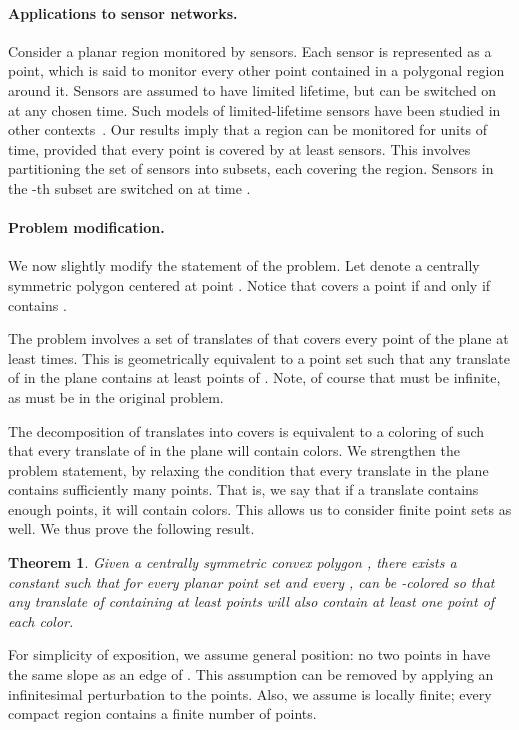 \documentclass[english,11pt]{article}
\newtheorem{theorem}{Theorem}
\begin{document}
\paragraph{Applications to sensor networks.}
Consider a planar region monitored by sensors. Each sensor is represented as a point, which is said to monitor every other point contained in a polygonal region around it. Sensors are assumed to have limited lifetime, but can be switched on at any chosen time. Such models of limited-lifetime sensors have been studied in other contexts~\cite{othersensors}. Our results imply that a region can be monitored for  units of time, provided that every point is covered by at least  sensors. This involves partitioning the set of sensors into  subsets, each covering the region. Sensors in the 
-th subset are switched on at time . 

\paragraph{Problem modification.}
We now slightly modify the statement of the problem.  Let  denote a centrally symmetric polygon  centered at point .  Notice that  covers a point  if and only if  contains .
 
The problem involves a set of translates of  that covers every point of the plane  at least  times. 
This is geometrically equivalent to a point set  such that any translate of  in the plane contains at least  points of .    
Note, of course that  must be infinite, as must be  in the original problem.

The decomposition of translates into  covers is equivalent to a coloring of  such that every translate of  in the plane will contain  colors.
We strengthen the problem statement, by relaxing the condition that every translate in the plane contains sufficiently many points.  That is, we say that if a translate contains enough points, it will contain  colors. This allows us to consider finite point sets as well. 
We thus prove the following result.

\begin{theorem}
\label{thm:rephrased}
Given a centrally symmetric convex polygon , there exists a constant  such that for every planar point set  and every , 
 can be -colored so that any translate of  containing at least  points will also contain at least one point of each color.
\end{theorem}

For simplicity of exposition, we assume general position: no two
points in  have the same slope as an edge of . This assumption
can be removed by applying an infinitesimal perturbation to the
points. Also, we assume  is locally finite; 
every compact region contains a finite number of points.
\end{document}
